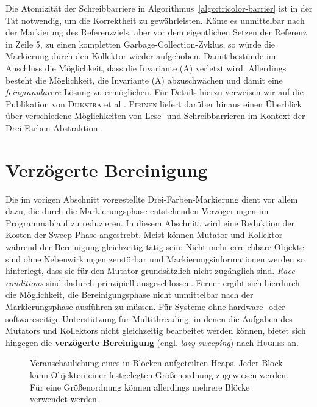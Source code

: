 Die Atomizität der Schreibbarriere  in Algorithmus~\ref{algo:tricolor-barrier} ist in der Tat notwendig, um die Korrektheit zu gewährleisten.
Käme es unmittelbar nach der Markierung des Referenzziels, aber vor dem eigentlichen Setzen der Referenz in Zeile 5, zu einen kompletten Garbage-Collection-Zyklus, so würde die Markierung durch den Kollektor wieder aufgehoben.
Damit bestünde im Anschluss die Möglichkeit, dass die Invariante (A) verletzt wird.
Allerdings besteht die Möglichkeit, die Invariante (A) abzuschwächen und damit eine \textit{feingranularere} Lösung zu ermöglichen.
Für Details hierzu verweisen wir auf die Publikation von \textsc{Dijkstra} et al \cite[S. 972ff]{dijkstra1978}.
\textsc{Pirinen} liefert darüber hinaus einen Überblick über verschiedene Möglichkeiten von Lese- und Schreibbarrieren im Kontext der Drei-Farben-Abstraktion \cite{pirinen}.




\section{Verzögerte Bereinigung}
\label{sec:lazy-sweep}
Die im vorigen Abschnitt vorgestellte Drei-Farben-Markierung dient vor allem dazu, die durch die Markierungsphase entstehenden Verzögerungen im Programmablauf zu reduzieren.
In diesem Abschnitt wird eine Reduktion der Kosten der Sweep-Phase angestrebt.
Meist können Mutator und Kollektor während der Bereinigung gleichzeitig tätig sein:
Nicht mehr erreichbare Objekte sind ohne Nebenwirkungen zerstörbar und Markierungsinformationen werden so hinterlegt, dass sie für den Mutator grundsätzlich nicht zugänglich sind.
\textit{Race conditions} sind dadurch prinzipiell ausgeschlossen.
Ferner ergibt sich hierdurch die Möglichkeit, die Bereinigungsphase nicht unmittelbar nach der Markierungsphase ausführen zu müssen.
Für Systeme ohne hardware- oder softwareseitige Unterstützung für Multithreading, in denen die Aufgaben des Mutators und Kollektors nicht gleichzeitig bearbeitet werden können, bietet sich hingegen die \textbf{verzögerte Bereinigung} (engl. \textit{lazy sweeping}) nach \textsc{Hughes} \cite{hughes} an.

\begin{figure}[h]
	\centering
	
	\caption[Veranschaulichung eines in Blöcken aufgeteilten Heaps]{Veranschaulichung eines in Blöcken aufgeteilten Heaps. Jeder Block kann Objekten einer festgelegten Größenordnung zugewiesen werden. Für eine Größenordnung können allerdings mehrere Blöcke verwendet werden.}
	\label{fig:heap-region}
\end{figure}

